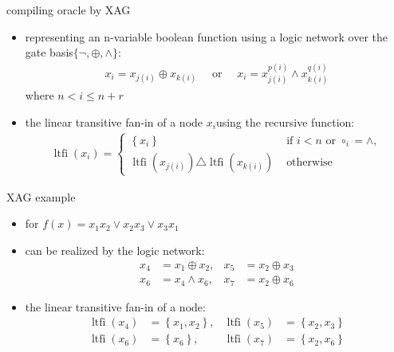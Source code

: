 \begin{frame}{compiling oracle by XAG}
  \begin{itemize}
    \item representing an n-variable boolean function using a logic network over the gate basis$\{\lnot ,\oplus ,\wedge \}$:
    \begin{align}
      x_{i} = x_{j(i)} \oplus x_{k(i)} \quad \text { or } \quad x_{i} = x_{j(i)}^{p(i)} \wedge x_{k(i)}^{q(i)}
    \end{align}
    where $n< i \leq n+r$
    \item  the linear transitive fan-in of a node $x_i $using the recursive function:
    \begin{align}
      \operatorname{ltfi}\left(x_{i}\right) = \left\{\begin{array}{ll}
      \left\{x_{i}\right\} & \text { if } i < n \text { or } \circ_{i}  = \wedge, \\
      \operatorname{ltfi}\left(x_{j(i)}\right) \triangle \operatorname{ltfi}\left(x_{k(i)}\right) & \text { otherwise }
      \end{array}\right.
    \end{align}
  \end{itemize}
\end{frame}
\begin{frame}{XAG example}
  \begin{itemize}
    \item for $f(x)=x_1x_2\vee x_2x_3\vee x_3x_1$
    \item can be realized by the logic network: 
    \begin{align}
      x_{4} & = x_{1} \oplus x_{2}, & x_{5} & = x_{2} \oplus x_{3} \\
      x_{6} & = x_{4} \wedge x_{6}, & x_{7} & = x_{2} \oplus x_{6}
    \end{align}
    \item the linear transitive fan-in of a node:
    \begin{align}
      \operatorname{ltfi}\left(x_{4}\right) & = \left\{x_{1}, x_{2}\right\} 
      ,&\operatorname{ltfi}\left(x_{5}\right) & = \left\{x_{2}, x_{3}\right\} \\
      \operatorname{ltfi}\left(x_{6}\right) & = \left\{x_{6}\right\} 
      ,&\operatorname{ltfi}\left(x_{7}\right) & = \left\{x_{2}, x_{6}\right\} 
    \end{align}
  \end{itemize}
\end{frame}

